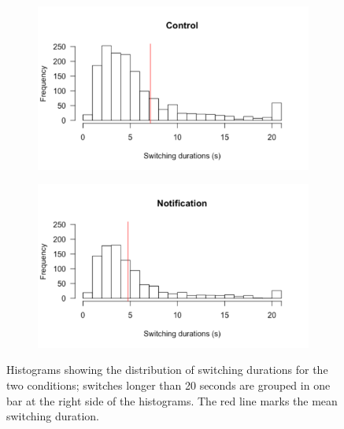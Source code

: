 \begin{figure}
\centering
\begin{subfigure}{0.5\textwidth}
\centerline{\includegraphics[scale=0.5]{images/ch56/ch56-histdurSwitches_Control.pdf}}
\end{subfigure}
\begin{subfigure}{0.5\textwidth}
\centerline{\includegraphics[scale=0.5]{images/ch56/ch56-histdurSwitches_Not.pdf}}
\end{subfigure}
\caption{Histograms showing the distribution of switching durations for the two conditions; switches longer than 20 seconds are grouped in one bar at the right side of the histograms. The red line marks the mean switching duration.}
\label{fig:ch56-histswitches}
\end{figure}

